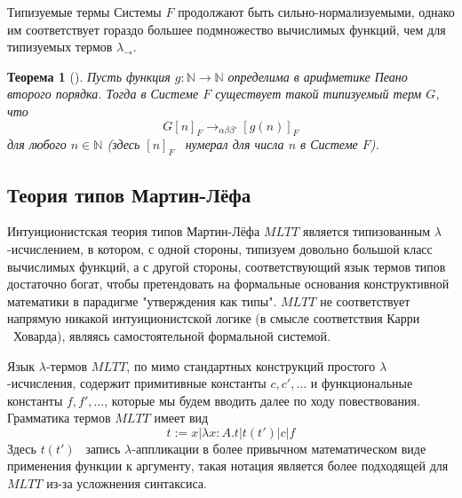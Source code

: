 \documentclass{article}[12pt]
\newtheorem{theorem}{Теорема}
\newcommand{\dash}{\textemdash\ }
\begin{document}
\begin{multicols}{2}
    \begin{prooftree}
    \end{prooftree}
    \begin{prooftree}
    \end{prooftree}
\end{multicols}
\begin{prooftree}
\end{prooftree}

Типизуемые термы Системы $F$ продолжают быть сильно-нормализуемыми\cite{SorUrz06}, однако им 
соответствует гораздо большее подмножество вычислимых функций, чем для типизуемых термов $\lambda_\rightarrow$.

\begin{theorem}[\cite{Gira71}]
    Пусть функция $g : \mathbb N \rightarrow \mathbb N$ определима в арифметике Пеано второго порядка.
    Тогда в Системе $F$ существует такой типизуемый терм $G$, что
    $$G[n]_F \rightarrow_{\alpha \beta \beta'} [g(n)]_F$$
    для любого $n \in \mathbb N$ (здесь $[n]_F$ \dash нумерал для числа $n$ в Системе $F$).
\end{theorem}

\subsection{Теория типов Мартин-Лёфа}

Интуиционистская теория типов Мартин-Лёфа $MLTT$ является типизованным $\lambda$-исчислением, в котором,
с одной стороны, типизуем довольно большой класс вычислимых функций, а с другой стороны, соответствующий
язык термов типов достаточно богат, чтобы претендовать на формальные основания конструктивной
математики в парадигме "утверждения как типы". $MLTT$ не соответствует напрямую никакой интуиционистской логике
(в смысле соответствия Карри \dash Ховарда), являясь самостоятельной формальной системой.

Язык $\lambda$-термов $MLTT$, по мимо стандартных конструкций простого $\lambda$-исчисления, содержит
примитивные константы $c, c', \dots$ и функциональные константы $f, f', \dots$, которые мы будем вводить
далее по ходу повествования. Грамматика термов $MLTT$ имеет вид
$$t := x | \lambda x : A . t | t(t') | c | f$$
Здесь $t(t')$ \dash запись $\lambda$-аппликации в более привычном математическом виде применения функции к аргументу,
такая нотация является более подходящей для $MLTT$ из-за усложнения синтаксиса.
\end{document}
